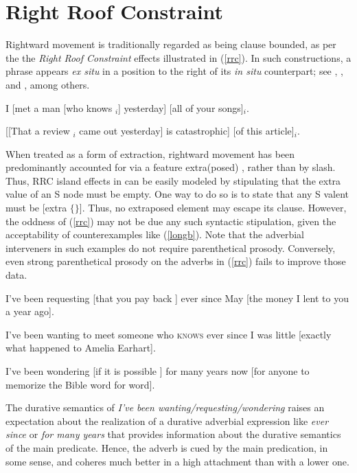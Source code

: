 \documentclass[output=paper]{langsci/langscibook}
\begin{document}
\section{Right Roof Constraint}

Rightward movement is traditionally regarded as being clause bounded, as per the 
the \emph{Right Roof Constraint}  \citep{Ross67} effects  illustrated in (\ref{rrc}). 
 In such constructions, a phrase appears \emph{ex situ} in a position 
to the right of its \emph{in situ} counterpart; see   \citet{akma75}, \citet{baltin78}, and  \citet{stowelldiss}, among others.

\ea \label{rrc}
\ea \bad{*}I [met a man [who knows \spc$_i$] yesterday] [all of your songs]$_i$.
\item \bad{*}[[That a review \spc$_i$ came out yesterday] is catastrophic] [of this article]$_i$.
\z
\z

\noindent
When treated as a form of extraction, rightward movement has been predominantly
accounted for via a feature {\sc extra(posed)} \citep{Noord:Bouma:96,eynde96,
kellerverb,KimSag2005}, rather than by {\sc slash}.  
Thus, RRC island effects in can be easily modeled by stipulating that the  {\sc extra} value of an S node must be empty. One way to do so
is to state that any S valent must be [{\sc extra} $\lbrace \rbrace$].
Thus, no extraposed element may escape its clause. However,  the oddness of (\ref{rrc}) may not be due any such syntactic stipulation, given the acceptability of counterexamples like (\ref{longb}). Note that the adverbial interveners in such examples do not  require parenthetical prosody. Conversely, even strong  parenthetical
prosody on the adverbs in (\ref{rrc}) fails to improve those data.


\ea \label{longb}
\ea  I've been requesting [that you pay back \spc] ever since May [the money
I lent to you a year ago].\\
  \citep[251]{kayne00}

\item I've been wanting to meet someone
who \textsc{knows} \spc ever since I was little [exactly what happened to Amelia Earhart].

\item  I've been wondering  [if it is possible   \spc]
for many years now [for anyone to memorize the Bible word for word].\\
\citep[861]{chavesrnr}
\z
\z

\noindent
The  durative semantics  of   \emph{I've been wanting/requesting/wondering} 
 raises an expectation about the realization of   a durative  
adverbial expression like  \emph{ever since} or \emph{for many years} that
provides information about the durative semantics of the main predicate.
Hence, the adverb is cued by the main predication, in some sense, and 
  coheres much better in a high attachment than with a lower one.
\end{document}
